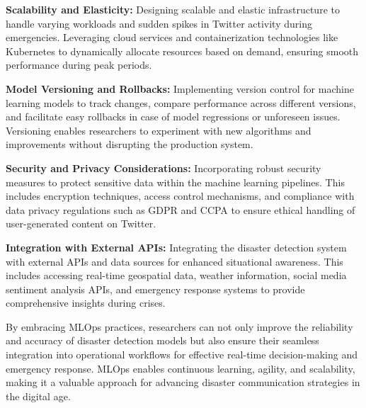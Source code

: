 \textbf{Scalability and Elasticity:} Designing scalable and elastic infrastructure to handle varying workloads and sudden spikes in Twitter activity during emergencies. Leveraging cloud services and containerization technologies like Kubernetes to dynamically allocate resources based on demand, ensuring smooth performance during peak periods.

\textbf{Model Versioning and Rollbacks:} Implementing version control for machine learning models to track changes, compare performance across different versions, and facilitate easy rollbacks in case of model regressions or unforeseen issues. Versioning enables researchers to experiment with new algorithms and improvements without disrupting the production system.

\textbf{Security and Privacy Considerations:} Incorporating robust security measures to protect sensitive data within the machine learning pipelines. This includes encryption techniques, access control mechanisms, and compliance with data privacy regulations such as GDPR and CCPA to ensure ethical handling of user-generated content on Twitter.

\textbf{Integration with External APIs:} Integrating the disaster detection system with external APIs and data sources for enhanced situational awareness. This includes accessing real-time geospatial data, weather information, social media sentiment analysis APIs, and emergency response systems to provide comprehensive insights during crises.

By embracing MLOps practices, researchers can not only improve the reliability and accuracy of disaster detection models but also ensure their seamless integration into operational workflows for effective real-time decision-making and emergency response. MLOps enables continuous learning, agility, and scalability, making it a valuable approach for advancing disaster communication strategies in the digital age.



